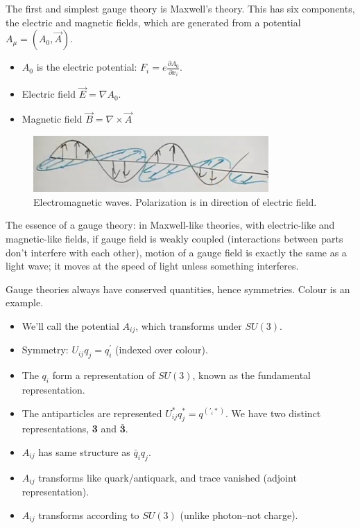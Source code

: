 \documentclass[]{article}
\begin{document}
The first and simplest gauge theory is Maxwell's theory. This has six components, the electric and magnetic fields, which are generated from a potential $A_\mu=(A_0,\vec{A})$.
\begin{itemize}
	\item  $A_0$ is the electric potential: $F_i=e \frac{\partial A_0}{\partial x_i}$.
	\item Electric field $\vec{E}=\nabla A_0$.
	\item Magnetic field $\vec{B}=\nabla \times \vec{A}$
\end{itemize}

\begin{figure}[H]
	\caption[Electromagnetic waves, illustrating Polarization.]{Electromagnetic waves. Polarization is in direction of electric field.}
	\includegraphics[width=0.8\textwidth]{2-5-EM-field}
\end{figure}

The essence of a gauge theory: in Maxwell-like theories, with electric-like and magnetic-like fields, if gauge field is weakly coupled (interactions between parts don't interfere with each other), motion of a gauge field is exactly the same as a light wave; it moves at the speed of light unless something interferes.

Gauge theories  always have conserved quantities, hence symmetries. Colour is an example.
\begin{itemize}
	\item  We'll call the potential $A_{ij}$, which transforms under $SU(3)$.
	\item Symmetry: $U_{ij} q_j = q^\prime_i$ (indexed over colour).
	\item The $q_i$ form a representation of $SU(3)$, known as the fundamental representation.
	\item The antiparticles are represented $U^*_{ij} q^*_j = q^(\prime_i*)$. We have two distinct representations, {\bfseries 3} and $\bm{\bar{3}}$.
	\item  $A_{ij}$ has same structure as $\bar{q}_i q_j$.
	\item $A_{ij}$ transforms like quark/antiquark, and  trace vanished (adjoint representation).
	\item $A_{ij}$ transforms according to $SU(3)$  (unlike photon--not charge).
\end{itemize}
\end{document}
